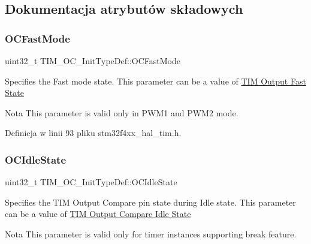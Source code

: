 \subsection{Dokumentacja atrybutów składowych}
\mbox{\label{struct_t_i_m___o_c___init_type_def_a4c4203c5ed779ac86fb793bb9d628e55}} 
\subsubsection{\texorpdfstring{O\+C\+Fast\+Mode}{OCFastMode}}
{\footnotesize\ttfamily uint32\+\_\+t T\+I\+M\+\_\+\+O\+C\+\_\+\+Init\+Type\+Def\+::\+O\+C\+Fast\+Mode}

Specifies the Fast mode state. This parameter can be a value of \hyperlink{group___t_i_m___output___fast___state}{T\+IM Output Fast State} \begin{DoxyNote}{Nota}
This parameter is valid only in P\+W\+M1 and P\+W\+M2 mode. 
\end{DoxyNote}


Definicja w linii 93 pliku stm32f4xx\+\_\+hal\+\_\+tim.\+h.

\mbox{\label{struct_t_i_m___o_c___init_type_def_ace3e2b76ca2fca0f4961585ed9ebecf5}} 
\subsubsection{\texorpdfstring{O\+C\+Idle\+State}{OCIdleState}}
{\footnotesize\ttfamily uint32\+\_\+t T\+I\+M\+\_\+\+O\+C\+\_\+\+Init\+Type\+Def\+::\+O\+C\+Idle\+State}

Specifies the T\+IM Output Compare pin state during Idle state. This parameter can be a value of \hyperlink{group___t_i_m___output___compare___idle___state}{T\+IM Output Compare Idle State} \begin{DoxyNote}{Nota}
This parameter is valid only for timer instances supporting break feature. 
\end{DoxyNote}


